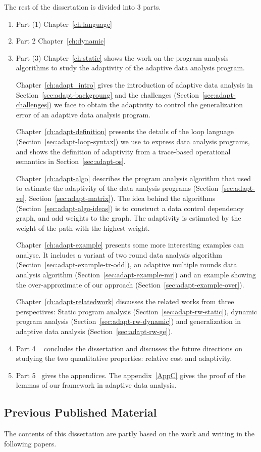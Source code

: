 The rest of the dissertation is divided into $3$ parts. 
\begin{enumerate}
    \item Part (1) Chapter~\ref{ch:language}
    
    \item Part {2} Chapter~\ref{ch:dynamic}
    
    \item Part (3) Chapter~\ref{ch:static} shows the work on the program analysis algorithms to study the adaptivity of the adaptive data analysis program.    

Chapter~\ref{ch:adapt_intro} gives the introduction of adaptive data analysis in Section~\ref{sec:adapt-backgroung} and the challenges (Section~\ref{sec:adapt-challenges}) we face to obtain the adaptivity to control the generalization error of an adaptive data analysis program.

Chapter~\ref{ch:adapt-definition} presents the details of the loop language (Section~\ref{sec:adapt-loop-syntax}) we use to express data analysis programs, and shows the definition of adaptivity from a trace-based operational semantics in Section~\ref{sec:adapt-os}. 


Chapter~\ref{ch:adapt-algo} describes the program analysis algorithm {\ADAPTSYSTEM} that used to estimate the adaptivity of the data analysis programs (Section~\ref{sec:adapt-ve}, Section~\ref{sec:adapt-matrix}). 
The idea behind the algorithms (Section~\ref{sec:adapt-algo-ideas}) is to construct a data control dependency graph, and add weights to the graph. The adaptivity is estimated by the weight of the path with the highest weight.

Chapter~\ref{ch:adapt-example} presents some more interesting examples {\ADAPTSYSTEM} can analyse. 
It includes a variant of two round data analysis algorithm (Section~\ref{sec:adapt-example-tr-odd}), 
an adaptive multiple rounds data analysis algorithm (Section~\ref{sec:adapt-example-mr}) and an example showing the over-approximate of our approach (Section~\ref{sec:adapt-example-over}). 

Chapter~\ref{ch:adapt-relatedwork} discusses the related works from three perspectives: Static program analysis (Section~\ref{sec:adapt-rw-static}), dynamic program analysis (Section~\ref{sec:adapt-rw-dynamic}) and generalization in adaptive data analysis (Section~\ref{sec:adapt-rw-ge}).  
\item Part {4} ~ concludes the dissertation and discusses the future directions on studying the two quantitative properties: relative cost and adaptivity.
\item Part {5} ~gives the appendices. 
 The appendix~\ref{AppC} gives the proof of the lemmas of our framework in adaptive data analysis.    
\end{enumerate}



\subsection{Previous Published Material}
The contents of this dissertation are partly based on the work and writing in the following papers.



